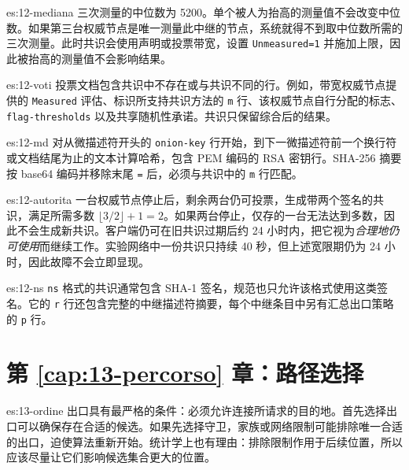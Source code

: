 \begin{soluzione}{es:12-mediana}
三次测量的中位数为 5200。单个被人为抬高的测量值不会改变中位数。如果第三台权威节点是唯一测量此中继的节点，系统就得不到取中位数所需的三次测量。此时共识会使用声明或投票带宽，设置 \texttt{Unmeasured=1} 并施加上限，因此被抬高的测量值不会影响结果。
\end{soluzione}

\begin{soluzione}{es:12-voti}
投票文档包含共识中不存在或与共识不同的行。例如，带宽权威节点提供的 \texttt{Measured} 评估、标识所支持共识方法的 \texttt{m} 行、该权威节点自行分配的标志、\texttt{flag-thresholds} 以及共享随机性承诺。共识只保留综合后的结果。
\end{soluzione}

\begin{soluzione}{es:12-md}
对从微描述符开头的 \texttt{onion-key} 行开始，到下一微描述符前一个换行符或文档结尾为止的文本计算哈希，包含 PEM 编码的 RSA 密钥行。SHA-256 摘要按 base64 编码并移除末尾 \texttt{=} 后，必须与共识中的 \texttt{m} 行匹配。
\end{soluzione}

\begin{soluzione}{es:12-autorita}
一台权威节点停止后，剩余两台仍可投票，生成带两个签名的共识，满足所需多数 $\lfloor3/2\rfloor+1=2$。如果两台停止，仅存的一台无法达到多数，因此不会生成新共识。客户端仍可在旧共识过期后约 24 小时内，把它视为\emph{合理地仍可使用}而继续工作。实验网络中一份共识只持续 40 秒，但上述宽限期仍为 24 小时，因此故障不会立即显现。
\end{soluzione}

\begin{soluzione}{es:12-ns}
\texttt{ns} 格式的共识通常包含 SHA-1 签名，规范也只允许该格式使用这类签名。它的 \texttt{r} 行还包含完整的中继描述符摘要，每个中继条目中另有汇总出口策略的 \texttt{p} 行。
\end{soluzione}

\section*{第 \ref{cap:13-percorso} 章：路径选择}

\begin{soluzione}{es:13-ordine}
出口具有最严格的条件：必须允许连接所请求的目的地。首先选择出口可以确保存在合适的候选。如果先选择守卫，家族或网络限制可能排除唯一合适的出口，迫使算法重新开始。统计学上也有理由：排除限制作用于后续位置，所以应该尽量让它们影响候选集合更大的位置。
\end{soluzione}

